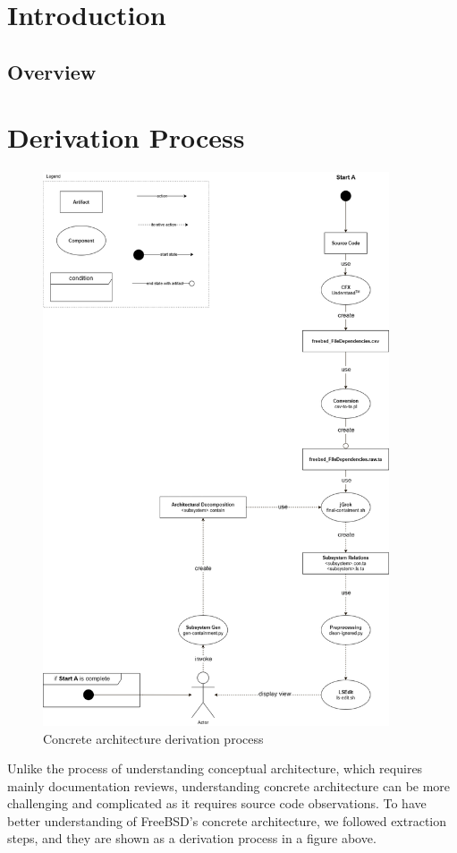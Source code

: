 \documentclass[12pt, dvipsnames, a4paper]{article}
\begin{document}
\section{Introduction}
\lipsum[1]

\subsection{Overview}
\lipsum[1]
\clearpage

\section{Derivation Process}
\begin{figure}[!htb]
	\center
	\includegraphics[width = 290pt]{assets/derivation_diagram.png}
	\caption{Concrete architecture derivation process \cite{derivation}}
\end{figure}
Unlike the process of understanding conceptual architecture, which requires mainly documentation reviews, understanding concrete architecture can be more challenging and complicated as it requires source code observations. To have better understanding of FreeBSD’s concrete architecture, we followed extraction steps, and they are shown as a derivation process in a figure above.
\end{document}
